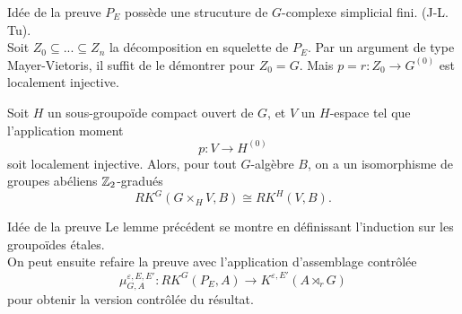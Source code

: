 \begin{frame}{Idée de la preuve}
$P_E$ possède une strucuture de $G$-complexe simplicial fini. (J-L. Tu).\\
\vspace{0.3 cm}
Soit $Z_0 \subseteq ...\subseteq Z_n$ la décomposition en squelette de $P_E$. Par un argument de type Mayer-Vietoris, il suffit de le démontrer pour $Z_0 = G$. Mais $p =r : Z_0 \rightarrow G^{(0)} $ est localement injective. \\
\vspace{0.3 cm}
\begin{lemfr}
Soit $H$ un sous-groupoïde compact ouvert de $G$, et $V$ un $H$-espace tel que l'application moment 
\[p: V\rightarrow H^{(0)}\] 
soit localement injective. Alors, pour tout $G$-algèbre $B$, on a un isomorphisme de groupes abéliens $\mathbb Z_2$-gradués
\[RK^G(G\times_H V,B)\cong RK^H(V,B).\]
\end{lemfr}
\end{frame}

\begin{frame}{Idée de la preuve}
Le lemme précédent se montre en définissant l'induction sur les groupoïdes étales.\\
\vspace{0.3 cm}
On peut ensuite refaire la preuve avec l'application d'assemblage contrôlée
\[\mu_{G,A}^{\varepsilon, E,E'} : RK^G(P_E,A)\rightarrow K^{\varepsilon,E'}(A\rtimes_r G)\]
pour obtenir la version contrôlée du résultat.
\end{frame}

